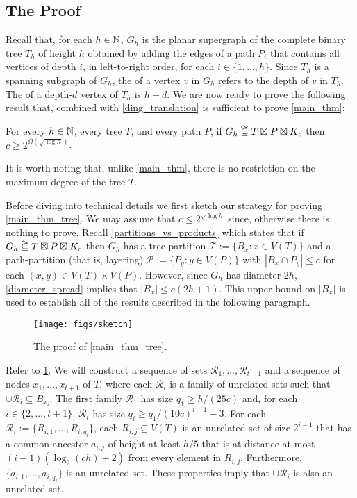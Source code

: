 \documentclass{patmorin}
\newcommand\subsetcong{\mathrel{\text{%
    \setbox0\hbox{$\subseteq$}%
    \rlap{\hbox to \wd0{\hss\hss\hss\raisebox{1.5\height}{$\sim$}\hss}}\box0
}}}
\renewcommand{\le}{\leqslant}
\renewcommand{\ge}{\geqslant}
\begin{document}
\subsection{The Proof}

Recall that, for each $h\in\mathbb{N}$, $G_{h}$ is the planar supergraph of the complete binary tree $T_h$ of height $h$ obtained by adding the edges of a path $P_i$ that contains all vertices of depth $i$, in left-to-right order, for each $i\in\{1,\ldots,h\}$.   Since $T_h$ is a spanning subgraph of $G_h$, the  of a vertex $v$ in $G_h$ refers to the depth of $v$ in $T_h$.  The  of a depth-$d$ vertex of $T_h$ is $h-d$.
We are now ready to prove the following result that, combined with \cref{ding_translation} is sufficient to prove \cref{main_thm}:

\begin{thm}\label{main_thm_tree}
  For every $h\in\mathbb{N}$, every tree $T$, and every path $P$, if $G_{h}\subsetcong T\boxtimes P\boxtimes K_c$ then $c\ge 2^{\Omega(\sqrt{\log h})}$.
\end{thm}

It is worth noting that, unlike \cref{main_thm}, there is no restriction on the maximum degree of the tree $T$.

Before diving into technical details we first sketch our strategy for proving \cref{main_thm_tree}.  We may assume that $c \le 2^{\sqrt{\log h}}$ since, otherwise there is nothing to prove.  Recall \cref{partitions_vs_products} which states that if $G_h\subsetcong T\boxtimes P\boxtimes K_c$ then $G_h$ has a tree-partition $\mathcal{T}:=\{B_x:x\in V(T)\}$ and a path-partition (that is, layering) $\mathcal{P}:=\{P_y:y\in V(P)\}$ with $|B_x\cap P_y|\le c$ for each $(x,y)\in V(T)\times V(P)$. However, since $G_h$ has diameter $2h$, \cref{diameter_spread} implies that $|B_x|\le c(2h+1)$. This upper bound on $|B_x|$ is used to establish all of the results described in the following paragraph.

\begin{figure}
  \begin{center}
    \texttt{[image: figs/sketch]}
  \end{center}
  \caption{The proof of \cref{main_thm_tree}.}
  \label{sketch}
\end{figure}

Refer to \cref{sketch}.  We will construct a sequence of sets $\mathcal{R}_1,\ldots,\mathcal{R}_{t+1}$ and a sequence of nodes $x_1,\ldots,x_{t+1}$ of $T$, where each $\mathcal{R}_i$ is a family of unrelated sets such that $\cup\mathcal{R}_i\subseteq B_{x_i}$. The first family $\mathcal{R}_1$ has size $q_1\ge h/(25c)$ and, for each $i\in\{2,\ldots,t+1\}$, $\mathcal{R}_i$ has size $q_i\ge q_1/(10c)^{i-1}-3$. For each $\mathcal{R}_i:=\{R_{i,1},\ldots,R_{i,q_i}\}$, each $R_{i,j}\subseteq V(T)$ is an unrelated set of size $2^{i-1}$ that has a common ancestor $a_{i,j}$ of height at least $h/5$ that is at distance at most $(i-1)(\log_2(ch)+2)$ from every element in $R_{i,j}$. Furthermore, $\{a_{i,1},\ldots,a_{i,q_{i}}\}$ is an unrelated set. These properties imply that $\cup\mathcal{R}_i$ is also an unrelated set.
\end{document}
